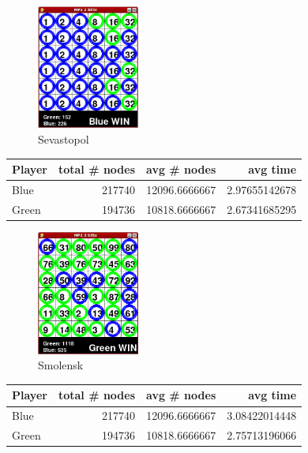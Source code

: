\begin{multicols*}{2}
\begin{figure}[H]
\centering
\includegraphics[width=0.3\textwidth]{graphics/mm_sevastopol.png}
\caption{Sevastopol}
\end{figure}
\begin{tabular}{l|r|r|r}
  Player & total \# nodes & avg \# nodes & avg time \\
  \hline
  Blue & 217740 & 12096.6666667 & 2.97655142678 \\
  Green & 194736 & 10818.6666667 & 2.67341685295 \\
\end{tabular}

\begin{figure}[H]
\centering
\includegraphics[width=0.3\textwidth]{graphics/mm_smolensk.png}
\caption{Smolensk}
\end{figure}
\begin{tabular}{l|r|r|r}
  Player & total \# nodes & avg \# nodes & avg time \\
  \hline
  Blue & 217740 & 12096.6666667 & 3.08422014448 \\
  Green & 194736 & 10818.6666667 & 2.75713196066 \\
\end{tabular}


\end{multicols*}
